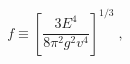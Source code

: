 \begin{equation}
\label{3-17}
f \equiv \left[\frac{3E^4}{8\pi^2 g^2 v^4}\right]^{1/3}\;,
\end{equation}

